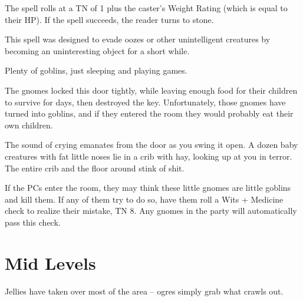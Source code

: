 \begin{multicols}{2}
The spell rolls at a TN of 1 plus the caster's Weight Rating (which is equal to their HP).
If the spell succeeds, the reader turns to stone.

This spell was designed to evade oozes or other unintelligent creatures by becoming an uninteresting object for a short while.




Plenty of goblins, just sleeping and playing games.

\goblin


\begin{exampletext}

	The gnomes locked this door tightly, while leaving enough food for their children to survive for days, then destroyed the key.
	Unfortunately, those gnomes have turned into goblins, and if they entered the room they would probably eat their own children.

\end{exampletext}

\begin{boxtext}

	The sound of crying emanates from the door as you swing it open.
	A dozen baby creatures with fat little noses lie in a crib with hay, looking up at you in terror.
	The entire crib and the floor around stink of shit.

\end{boxtext}

If the PCs enter the room, they may think these little gnomes are little goblins and kill them.
If any of them try to do so, have them roll a Wits + Medicine check to realize their mistake, TN 8.
Any gnomes in the party will automatically pass this check.

\end{multicols}


\label{laddertop}

\section{Mid Levels}

\begin{multicols}{2}


Jellies have taken over most of the area -- ogres simply grab what crawls out.

\jelly

\jelly


\end{multicols}

